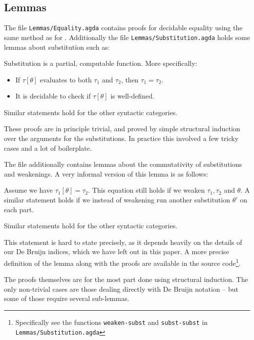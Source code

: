\subsection{Lemmas}

The file \texttt{Lemmas/Equality.agda} contains proofs for decidable equality
using the same method as for \ATALe. Additionally the file
\texttt{Lemmas/Substitution.agda} holds some lemmas about substitution such as:

\begin{lemma}
  \label{lemma:computsubst}
  Substitution is a partial, computable function. More specifically:
  \begin{itemize}
  \item If $\tau[\theta]$ evaluates to both $\tau_1$ and $\tau_2$, then
    $\tau_1 = \tau_2$.
  \item It is decidable to check if $\tau[\theta]$ is well-defined.
  \end{itemize}

  Similar statements hold for the other syntactic categories.
\end{lemma}

These proofs are in principle trivial, and proved by simple structural induction
over the arguments for the substitutions. In practice this involved a few tricky
cases and a lot of boilerplate.

The file additionally contains lemmas about the commutativity of substitutions
and weakenings. A very informal version of this lemma is as follows:

\begin{lemma}
  Assume we have $\tau_1[\theta] = \tau_2$. This equation still holds if we
  weaken $\tau_1, \tau_2$ and $\theta$. A similar statement holds if we
  instead of weakening run another substitution $\theta'$ on each part.

  Similar statements hold for the other syntactic categories.
\end{lemma}

This statement is hard to state precisely, as it depends heavily on the details
of our De Bruijn indices, which we have left out in this paper. A more precise
definition of the lemma along with the proofs are available in the source
code\footnote{Specifically see the functions \texttt{weaken-subst} and
  \texttt{subst-subst} in \texttt{Lemmas/Substitution.agda}}.

The proofs themselves are for the most part done using structural induction. The
only non-trivial cases are those dealing directly with De Bruijn notation -- but
some of those require several sub-lemmas.

